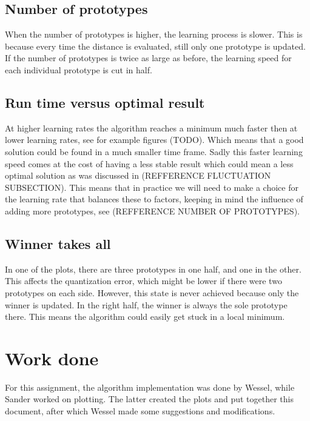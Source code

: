 \documentclass[10pt,a4paper]{article}
\begin{document}
\subsection{Number of prototypes}
When the number of prototypes is higher, the learning process is slower. This is because every time the distance is evaluated, still only one prototype is updated. If the number of prototypes is twice as large as before, the learning speed for each individual prototype is cut in half.

\subsection{Run time versus optimal result}
At higher learning rates the algorithm reaches a minimum much faster then at lower learning rates, see for example figures (TODO). Which means that a good solution could be found in a much smaller time frame. Sadly this faster learning speed comes at the cost of having a less stable result which could mean a less optimal solution as was discussed in (REFFERENCE FLUCTUATION SUBSECTION). This means that in practice we will need to make a choice for the learning rate that balances these to factors, keeping in mind the influence of adding more prototypes, see (REFFERENCE NUMBER OF PROTOTYPES).

\subsection{Winner takes all}
In one of the plots, there are three prototypes in one half, and one in the other. This affects the quantization error, which might be lower if there were two prototypes on each side. However, this state is never achieved because only the winner is updated. In the right half, the winner is always the sole prototype there. This means the algorithm could easily get stuck in a local minimum.

\section{Work done}
For this assignment, the algorithm implementation was done by Wessel, while Sander worked on plotting. The latter created the plots and put together this document, after which Wessel made some suggestions and modifications.
\end{document}
